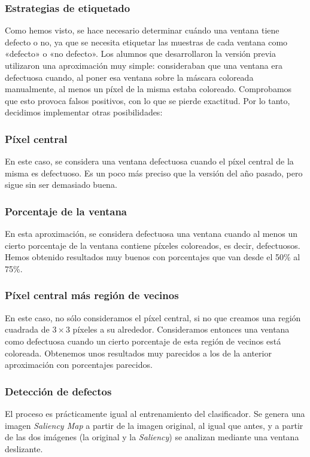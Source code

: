 \subsubsection{Estrategias de etiquetado}
Como hemos visto, se hace necesario determinar cuándo una ventana tiene defecto o no, ya que se necesita etiquetar las muestras de cada ventana como «defecto» o «no defecto». Los alumnos que desarrollaron la versión previa utilizaron una aproximación muy simple: consideraban que una ventana era defectuosa cuando, al poner esa ventana sobre la máscara coloreada manualmente, al menos un píxel de la misma estaba coloreado. Comprobamos que esto provoca falsos positivos, con lo que se pierde exactitud. Por lo tanto, decidimos implementar otras posibilidades:

\subsubsection*{Píxel central}
En este caso, se considera una ventana defectuosa cuando el píxel central de la misma es defectuoso. Es un poco más preciso que la versión del año pasado, pero sigue sin ser demasiado buena.

\subsubsection*{Porcentaje de la ventana}
En esta aproximación, se considera defectuosa una ventana cuando al menos un cierto porcentaje de la ventana contiene píxeles coloreados, es decir, defectuosos. Hemos obtenido resultados muy buenos con porcentajes que van desde el 50\% al 75\%.

\subsubsection*{Píxel central más región de vecinos}
En este caso, no sólo consideramos el píxel central, si no que creamos una región cuadrada de $3 \times 3$ píxeles a su alrededor. Consideramos entonces una ventana como defectuosa cuando un cierto porcentaje de esta región de vecinos está coloreada. Obtenemos unos resultados muy parecidos a los de la anterior aproximación con porcentajes parecidos.


\subsubsection{Detección de defectos}
El proceso es prácticamente igual al entrenamiento del clasificador. Se genera una imagen \emph{Saliency Map} a partir de la imagen original, al igual que antes, y a partir de las dos imágenes (la original y la \emph{Saliency}) se analizan mediante una ventana deslizante.

